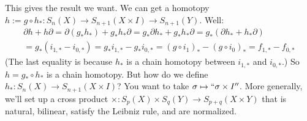 \documentclass{amsart}
\theoremstyle{theorem}
\theoremstyle{definition}
\begin{document}
This gives the result we want. We can get a homotopy $h:=g\circ h_\ast:S_n(X)\to S_{n+1}(X\times I)\to S_{n+1}(Y)$. Well:
		\begin{multline*}
		\partial h + h\partial = \partial(g_\ast h_\ast) + g_\ast h_\ast\partial=g_\ast\partial h_\ast + g_\ast h_\ast \partial = g_\ast(\partial h_\ast + h_\ast\partial)\\
		 = g_\ast(i_{1,\ast} - i_{0,\ast}) = g_\ast i_{1,\ast} - g_\ast i_{0,\ast} = (g\circ i_1)_\ast - (g\circ i_0)_{\ast} = f_{1,\ast} - f_{0,\ast}
		\end{multline*}
(The last equality is because $h_\ast$ is a chain homotopy between $i_{1,\ast}$ and $i_{0,\ast}$.) So $h=g_\ast\circ h_\ast$ is a chain homotopy. But how do we define $h_\ast:S_n(X)\to S_{n+1}(X\times I)$? You want to take $\sigma\mapsto``\sigma\times I''$. More generally, we'll set up a cross product $\times:S_p(X)\times S_q(Y)\to S_{p+q}(X\times Y)$ that is natural, bilinear, satisfy the Leibniz rule, and are normalized.
\end{document}
